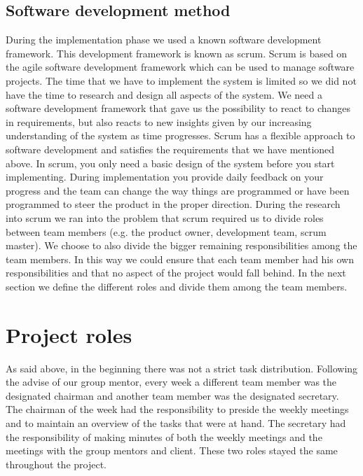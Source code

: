 \subsection{Software development method}\label{software_development_method}
During the implementation phase we used a known software development framework.
This development framework is known as scrum.
Scrum is based on the agile software development framework which can be used to 
manage software projects.
The time that we have to implement the system is limited so we did not have the time to research and design all aspects of the system. We need a software development framework that gave us the possibility to react to changes in requirements, but also reacts to new insights given by our increasing understanding of the system as time progresses.
Scrum has a flexible approach to software development and satisfies the requirements that we have mentioned above.
In scrum, you only need a basic design of the system before you start implementing.
During implementation you provide daily feedback on your progress and the team can change the way things are programmed or have been programmed to steer the product in the proper direction.
During the research into scrum we ran into the problem that scrum required us to divide roles between team members (e.g. the product owner, development team, scrum master).
We choose to also divide the bigger remaining responsibilities among the team members.
In this way we could ensure that each team member had his own responsibilities and that no aspect of the project would fall behind.
In the next section we define the different roles and divide them among the team members.

\section{Project roles}
As said above, in the beginning there was not a strict task distribution.
Following the advise of our group mentor, every week a different team member was the designated chairman and another team member was the designated secretary.
The chairman of the week had the responsibility to preside the weekly meetings and to maintain an overview of the tasks that were at hand.
The secretary had the responsibility of making minutes of both the weekly meetings and the meetings with the group mentors and client.
These two roles stayed the same throughout the project.

